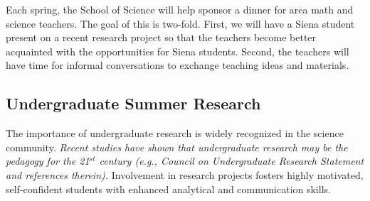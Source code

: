 \documentclass[12pt, preprint]{aastex}
\begin{document}
{Each spring, the School of Science will help sponsor a dinner for area math and
science teachers.  The goal of this is two-fold.  First, we will have a Siena student
present on a recent research project so that the teachers become better acquainted with
the opportunities for Siena students.  Second, the teachers will have time for informal
conversations to exchange teaching ideas and materials.

\vspace*{-.7cm}
\subsection{Undergraduate Summer Research}
\vspace*{-.4cm}
The importance of undergraduate research is widely recognized
in the science community.
{\em Recent studies have shown that undergraduate research may be the
pedagogy for the 21$^{st}$ century (e.g., Council on Undergraduate Research
Statement and references therein).}
Involvement in research projects
fosters highly motivated, self-confident students with enhanced
analytical and communication skills. 




}
\end{document}
